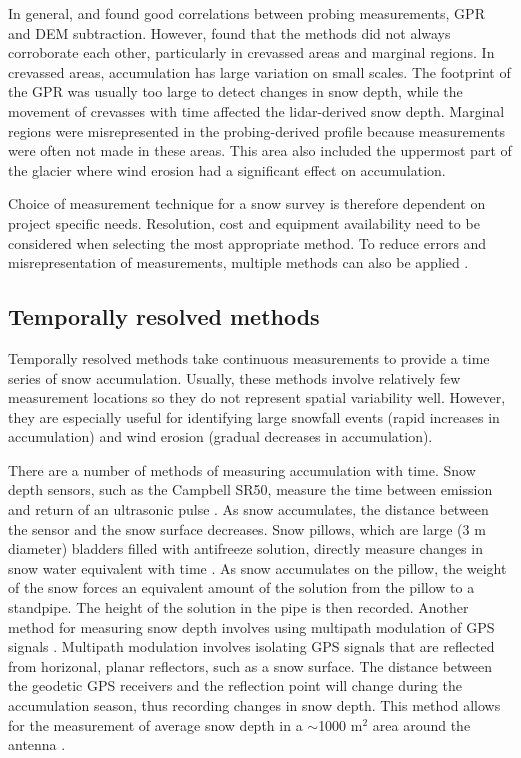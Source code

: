 \documentclass{sfuthesis}
\begin{document}
{\begin{appendices}
In general, \cite{Machguth2006} and \cite{Sold2013} found good correlations between probing measurements, GPR and DEM subtraction. However, \cite{Sold2013} found that the methods did not always corroborate each other, particularly in crevassed areas and marginal regions. In crevassed areas, accumulation has large variation on small scales. The footprint of the GPR was usually too large to detect changes in snow depth, while the movement of crevasses with time affected the lidar-derived snow depth. Marginal regions were misrepresented in the probing-derived profile because measurements were often not made in these areas. This area also included the uppermost part of the glacier where wind erosion had a significant effect on accumulation. 

Choice of measurement technique for a snow survey is therefore dependent on project specific needs. Resolution, cost and equipment availability need to be considered when selecting the most appropriate method. To reduce errors and misrepresentation of measurements, multiple methods can also be applied \citep{Machguth2006}. 

\subsection{Temporally resolved methods}
Temporally resolved methods take continuous measurements to provide a time series of snow accumulation. Usually, these methods involve relatively few measurement locations so they do not represent spatial variability well. However, they are especially useful for identifying large snowfall events (rapid increases in accumulation) and wind erosion (gradual decreases in accumulation). 

There are a number of methods of measuring accumulation with time. Snow depth sensors, such as the Campbell SR50, measure the time between emission and return of an ultrasonic pulse \citep{Ryan2008}. As snow accumulates, the distance between the sensor and the snow surface decreases. Snow pillows, which are large (3 m diameter) bladders filled with antifreeze solution, directly measure changes in snow water equivalent with time \citep{Archer1995}. As snow accumulates on the pillow, the weight of the snow forces an equivalent amount of the solution from the pillow to a standpipe. The height of the solution in the pipe is then recorded. Another method for measuring snow depth involves using multipath modulation of GPS signals \citep{Larson2009,McCreight2014}. Multipath modulation involves isolating GPS signals that are reflected from horizonal, planar reflectors, such as a snow surface. The distance between the geodetic GPS receivers and the reflection point will change during the accumulation season, thus recording changes in snow depth. This method allows for the measurement of average snow depth in a $\sim$1000 m$^2$ area around the antenna \citep{McCreight2014}.


\end{appendices}}
\end{document}
